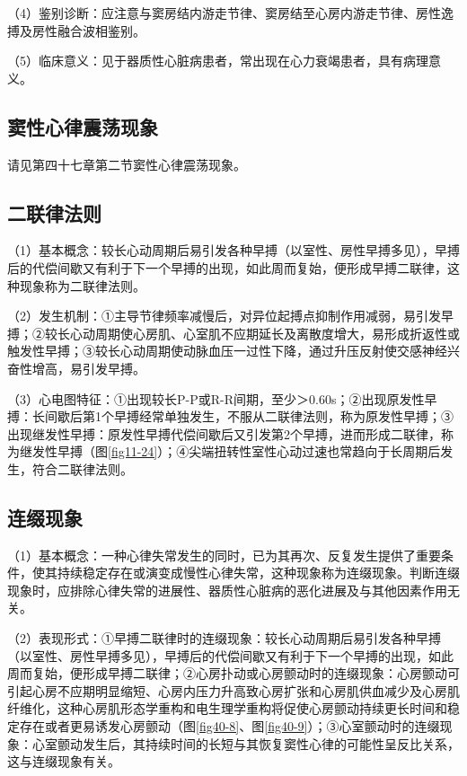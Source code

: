 （4）鉴别诊断：应注意与窦房结内游走节律、窦房结至心房内游走节律、房性逸搏及房性融合波相鉴别。

（5）临床意义：见于器质性心脏病患者，常出现在心力衰竭患者，具有病理意义。

\protect\hypertarget{text00047.htmlux5cux23subid539}{}{}

\subsection{窦性心律震荡现象}

请见第四十七章第二节窦性心律震荡现象。

\protect\hypertarget{text00047.htmlux5cux23subid540}{}{}

\subsection{二联律法则}

（1）基本概念：较长心动周期后易引发各种早搏（以室性、房性早搏多见），早搏后的代偿间歇又有利于下一个早搏的出现，如此周而复始，便形成早搏二联律，这种现象称为二联律法则。

（2）发生机制：①主导节律频率减慢后，对异位起搏点抑制作用减弱，易引发早搏；②较长心动周期使心房肌、心室肌不应期延长及离散度增大，易形成折返性或触发性早搏；③较长心动周期使动脉血压一过性下降，通过升压反射使交感神经兴奋性增高，易引发早搏。

（3）心电图特征：①出现较长P-P或R-R间期，至少＞0.60s；②出现原发性早搏：长间歇后第1个早搏经常单独发生，不服从二联律法则，称为原发性早搏；③出现继发性早搏：原发性早搏代偿间歇后又引发第2个早搏，进而形成二联律，称为继发性早搏（图\ref{fig11-24}）；④尖端扭转性室性心动过速也常趋向于长周期后发生，符合二联律法则。

\protect\hypertarget{text00047.htmlux5cux23subid541}{}{}

\subsection{连缀现象}

（1）基本概念：一种心律失常发生的同时，已为其再次、反复发生提供了重要条件，使其持续稳定存在或演变成慢性心律失常，这种现象称为连缀现象。判断连缀现象时，应排除心律失常的进展性、器质性心脏病的恶化进展及与其他因素作用无关。

（2）表现形式：①早搏二联律时的连缀现象：较长心动周期后易引发各种早搏（以室性、房性早搏多见），早搏后的代偿间歇又有利于下一个早搏的出现，如此周而复始，便形成早搏二联律；②心房扑动或心房颤动时的连缀现象：心房颤动可引起心房不应期明显缩短、心房内压力升高致心房扩张和心房肌供血减少及心房肌纤维化，这种心房肌形态学重构和电生理学重构将促使心房颤动持续更长时间和稳定存在或者更易诱发心房颤动（图\ref{fig40-8}、图\ref{fig40-9}）；③心室颤动时的连缀现象：心室颤动发生后，其持续时间的长短与其恢复窦性心律的可能性呈反比关系，这与连缀现象有关。

